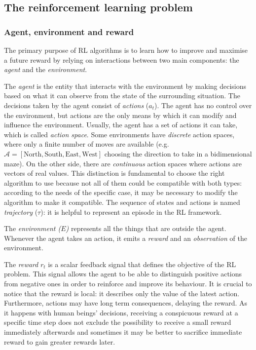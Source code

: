 \subsection{The reinforcement learning problem}

\subsubsection{Agent, environment and reward}

The primary purpose of RL algorithms is to learn how to improve and maximise a future reward by relying on interactions between two main components: the \textit{agent} and the \textit{environment}.

The \textit{agent} is the entity that interacts with the environment by making decisions based on what it can observe from the state of the surrounding situation. The decisions taken by the agent consist of \textit{actions} ($a_t$).  The agent has no control over the environment, but actions are the only means by which it can modify and influence the environment.
Usually, the agent has a set of actions it can take, which is called \textit{action space}.
Some environments have \textit{discrete} action spaces, where only a finite number of moves are available (e.g. $\mathcal{A} = [\text{North}, \text{South}, \text{East}, \text{West}]$ choosing the direction to take in a bidimensional maze). On the other side, there are \textit{continuous} action spaces where actions are vectors of real values.
This distinction is fundamental to choose the right algorithm to use because not all of them could be compatible with both types: according to the needs of the specific case, it may be necessary to modify the algorithm to make it compatible. The sequence of states and actions is named \textit{trajectory} ($\tau$): it is helpful to represent an episode in the RL framework.

The \textit{environment ($E$)} represents all the things that are outside the agent. Whenever the agent takes an action, it emits a \textit{reward} and an \textit{observation} of the environment.

The \textit{reward} $r_t$ is a scalar feedback signal that defines the objective of the RL problem. This signal allows the agent to be able to distinguish positive actions from negative ones in order to reinforce and improve its behaviour. It is crucial to notice that the reward is local: it describes only the value of the latest action. Furthermore, actions may have long term consequences, delaying the reward. As it happens with human beings' decisions, receiving a conspicuous reward at a specific time step does not exclude the possibility to receive a small reward immediately afterwards and sometimes it may be better to sacrifice immediate reward to gain greater rewards later.

